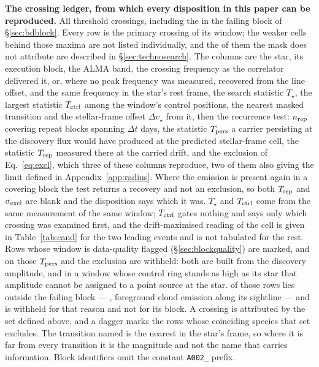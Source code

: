 \begin{table}
\centering
\caption{\textbf{The crossing ledger, from which every disposition in this
paper can be reproduced.} All \EvNCrossRaw{} threshold crossings,
including the \EvNCrossFlag{} in the failing block of \S\ref{sec:bdblock}.
Every row is the primary crossing of its window; the \CkNSecondary{} weaker
cells behind those maxima are not listed individually, and the
\CkNSecUnattrWord{} of them the mask does not attribute are described in
\S\ref{sec:technosearch}. The columns are
the star, its execution block, the ALMA band, the crossing
frequency as the correlator delivered it, or, where no peak frequency was
measured, recovered from the line offset, and the same frequency in the star's
rest frame, the search statistic $T_\star$, the largest statistic
$T_{\rm ctrl}$ among the window's \NCtrl{} control positions, the nearest
masked transition and the stellar-frame offset $\Delta v_\star$ from it, then
the recurrence test: $n_{\rm rep}$ covering repeat blocks spanning $\Delta t$
days, the statistic $T_{\rm pers}$ a carrier persisting at the discovery flux
would have produced at the predicted stellar-frame cell, the statistic
$T_{\rm rep}$ measured there at the carried drift, and the exclusion of
Eq.~\ref{eq:excl}, which three of these columns reproduce, two of them also
giving the limit defined in Appendix~\ref{app:radius}. Where the emission is
present again in a covering block the test returns a recovery and not an
exclusion, so both $T_{\rm rep}$ and $\sigma_{\rm excl}$ are blank and the
disposition says which it was.
$T_\star$ and $T_{\rm ctrl}$ come from the same measurement of the
same window; $T_{\rm ctrl}$ gates nothing and says only which crossing was
examined first, and the drift-maximised reading of the cell is given in
Table~\ref{tab:cand} for the two leading events and is not tabulated for
the rest. Rows whose window is data-quality flagged
(\S\ref{sec:blockquality}) are marked, and on those $T_{\rm pers}$ and the
exclusion are withheld: both are built from the discovery amplitude, and in a
window whose control ring stands as high as its star that amplitude cannot be
assigned to a point source at the star. \BkFlagNCrossOther{} of those rows
lies outside the failing block --- \BkFlagOtherStar, foreground cloud
emission along its sightline --- and
is withheld for that reason and not for its block. A crossing is attributed
by the set defined above, and a dagger marks the \MkNSODecide{} rows whose
coinciding species that set excludes. The transition named is the nearest in
the star's frame, so where it is far from every transition it is the magnitude
and not the name that carries information. Block identifiers omit the constant
\texttt{A002\_} prefix.}
\label{tab:ledger}
\tiny

\end{table}

